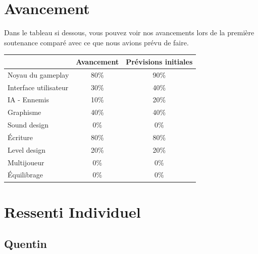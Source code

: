 \documentclass[a4page, 14pt]{extarticle}
\begin{document}
\section{Avancement}
    {Dans le tableau si dessous, vous pouvez voir nos avancements lors de la première soutenance comparé avec ce que nous avions prévu de faire.}
    \begin{center}
        \begin{tabular}{|l|c|c|}
            \hline
             & Avancement & Prévisions initiales\\
            \hline
            Noyau du gameplay & 80\% & 90\% \\
            Interface utilisateur & 30\% & 40\% \\
            IA - Ennemis & 10\% & 20\% \\
            Graphisme & 40\% & 40\% \\
            Sound design & 0\% & 0\% \\
            Écriture & 80\% & 80\% \\
            Level design & 20\% & 20\% \\
            Multijoueur & 0\% & 0\% \\
            Équilibrage & 0\% & 0\% \\
            \hline
        \end{tabular}
    \end{center}

\section{Ressenti Individuel}
    \subsection{Quentin}
\end{document}
